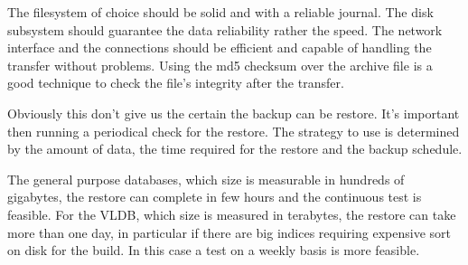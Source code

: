 The filesystem of choice should be solid and with a reliable journal. The disk subsystem should
guarantee the data reliability rather the speed. The network interface and the connections should be
efficient and capable of handling the transfer without problems. Using the md5 checksum over the archive
file is a good technique to check the file's integrity after the transfer.\newline

Obviously  this don't give us the certain the backup can be restore. It's important then running a
periodical check for the restore. The strategy to use is determined by the amount
of data, the time required for the restore and the backup schedule.\newline

The general purpose databases, which size is measurable in hundreds of gigabytes, the restore can
complete in few hours and the continuous test is feasible. For the VLDB, which size is measured in
terabytes, the restore can take more than one day, in particular if there are big indices requiring
expensive sort on disk for the build. In this case a test on a weekly basis is more feasible.
